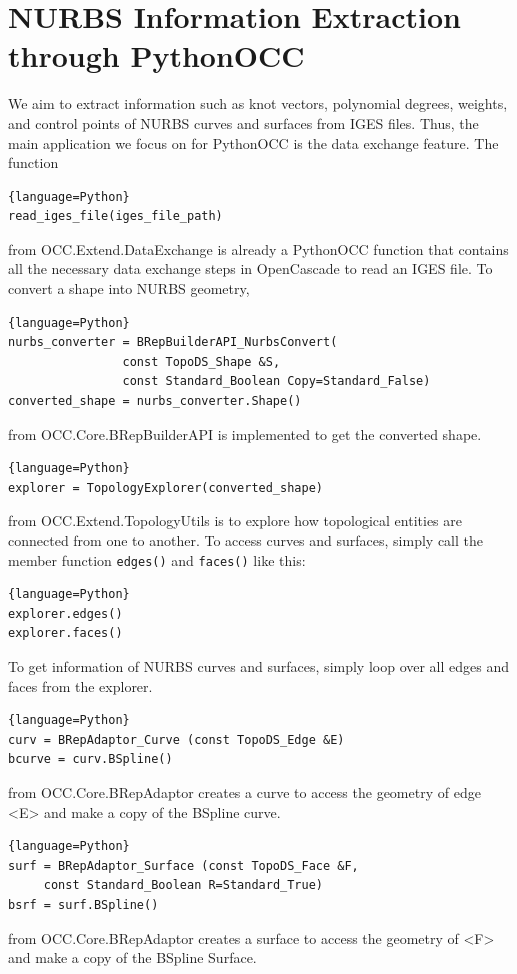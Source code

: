 \documentclass[12pt, a4paper]{report}
\begin{document}
\section{NURBS Information Extraction through PythonOCC}
We aim to extract information such as knot vectors, polynomial degrees, weights, and control points of NURBS curves and surfaces from IGES files. Thus, the main application we focus on for PythonOCC is the data exchange feature. The function
\vspace{0.5pt}
\begin{lstlisting}{language=Python}
read_iges_file(iges_file_path)
\end{lstlisting}
from OCC.Extend.DataExchange is already a PythonOCC function that contains all the necessary data exchange steps in OpenCascade to read an IGES file.
To convert a shape into NURBS geometry,
\vspace{12pt}
\begin{lstlisting}{language=Python}
nurbs_converter = BRepBuilderAPI_NurbsConvert(
                const TopoDS_Shape &S, 
                const Standard_Boolean Copy=Standard_False) 
converted_shape = nurbs_converter.Shape()
\end{lstlisting}
from OCC.Core.BRepBuilderAPI is implemented to get the converted shape. 
\vspace{12pt}
\begin{lstlisting}{language=Python}
explorer = TopologyExplorer(converted_shape)
\end{lstlisting}
from OCC.Extend.TopologyUtils is to explore how topological entities are connected from one to another. To access curves and surfaces, simply call the member function \texttt{edges()} and \texttt{faces()} like this:
\vspace{12pt}
\begin{lstlisting}{language=Python}
explorer.edges()
explorer.faces()
\end{lstlisting}
To get information of NURBS curves and surfaces, simply loop over all edges and faces from the explorer.

\vspace{12pt}
\begin{lstlisting}{language=Python}
curv = BRepAdaptor_Curve (const TopoDS_Edge &E) 
bcurve = curv.BSpline() 
\end{lstlisting}
from OCC.Core.BRepAdaptor creates a curve to access the geometry of edge <E> and make a copy of the BSpline curve. 
\vspace{12pt}
\begin{lstlisting}{language=Python}
surf = BRepAdaptor_Surface (const TopoDS_Face &F, 
     const Standard_Boolean R=Standard_True)
bsrf = surf.BSpline()
\end{lstlisting}
from OCC.Core.BRepAdaptor creates a surface to access the geometry of <F> and make a copy of the BSpline Surface. 
\end{document}
